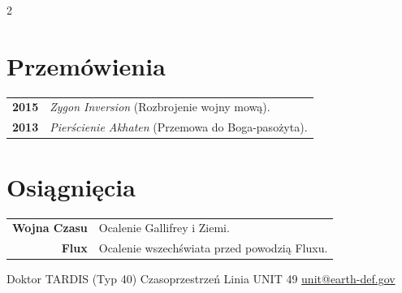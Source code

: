 \documentclass[lighthipster]{simplehipstercv}
\newlength{\rightcolwidth}
\begin{document}
\begin{paracol}{2}
\begin{minipage}[t]{0.35\textwidth}
\section*{Przemówienia}
\begin{tabular}{>{\footnotesize\bfseries}r >{\footnotesize}p{}}
    2015 & \emph{Zygon Inversion} (Rozbrojenie wojny mową). \\
    2013 & \emph{Pierścienie Akhaten} (Przemowa do Boga-pasożyta).
\end{tabular}
\bigskip

\section*{Osiągnięcia}
\begin{tabular}{>{\footnotesize\bfseries}r >{\footnotesize}p{}}
    Wojna Czasu & Ocalenie Gallifrey i Ziemi. \\
    Flux & Ocalenie wszechświata przed powodzią Fluxu.
\end{tabular}
\end{minipage}

\vfill{}

\setlength{\parindent}{0pt}
\begin{minipage}[t]{0.95\rightcolwidth}
\begin{center}\fontfamily{\sfdefault}\selectfont \color{black!70}
{\small Doktor  TARDIS (Typ 40)  Czasoprzestrzeń  Linia UNIT 49 \newline{} \protect\url{unit@earth-def.gov}
}
\end{center}
\end{minipage}

\end{paracol}
\end{document}

